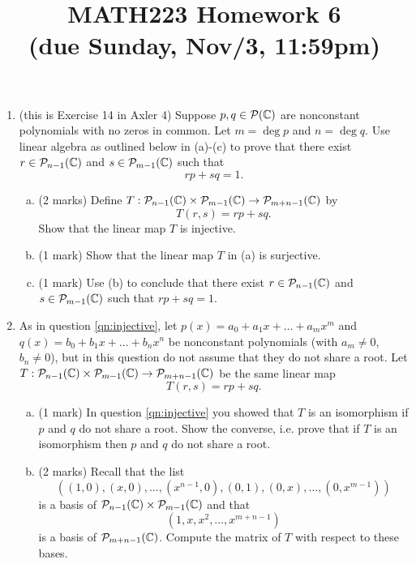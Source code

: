 \documentclass[12pt]{article}
\begin{document}
\title{MATH223 Homework 6\\ (due Sunday, Nov/3, 11:59pm)}
\author{}
\date{}
\maketitle
{}

\begin{enumerate}
\item \label{qn:injective}(this is Exercise 14 in Axler 4) Suppose $p,q\in\mathcal{P}(\mathbb{C})$ are nonconstant polynomials with no zeros in common. Let $m=\deg p$ and $n=\deg q$. Use linear algebra as outlined below in (a)-(c) to prove that there exist $r\in \mathcal{P}_{n-1}(\mathbb{C})$ and $s\in\mathcal{P}_{m-1}(\mathbb{C})$ such that
  \[
    rp+sq=1.
  \]
  \begin{enumerate}[(a)]
  \item (2 marks) Define $T:\mathcal{P}_{n-1}(\mathbb{C})\times \mathcal{P}_{m-1}(\mathbb{C})\to \mathcal{P}_{m+n-1}(\mathbb{C})$ by
    \[
      T(r,s)=rp+sq.
    \]
    Show that the linear map $T$ is injective.
  \item (1 mark) Show that the linear map $T$ in (a) is surjective.
  \item (1 mark) Use (b) to conclude that there exist $r\in\mathcal{P}_{n-1}(\mathbb{C})$ and $s\in\mathcal{P}_{m-1}(\mathbb{C})$ such that \mbox{$rp+sq=1$}.
  \end{enumerate}
\item \label{qn:resultant} As in question \ref{qn:injective}, let $p(x)=a_0+a_1x+\ldots +a_mx^m$ and $q(x)=b_0+b_1x+\ldots +b_nx^n$ be nonconstant polynomials (with $a_m\neq 0$, $b_n\neq 0$), but in this question do not assume that they do not share a root. Let $T:\mathcal{P}_{n-1}(\mathbb{C})\times \mathcal{P}_{m-1}(\mathbb{C})\to \mathcal{P}_{m+n-1}(\mathbb{C})$ be the same linear map
  \[
    T(r,s)=rp+sq.    
  \]
  \begin{enumerate}[(a)]
  \item (1 mark) In question \ref{qn:injective} you showed that $T$ is an isomorphism if $p$ and $q$ do not share a root. Show the converse, i.e. prove that if $T$ is an isomorphism then $p$ and $q$ do not share a root.
  \item (2 marks) Recall that the list
    \[
      \left((1,0),(x,0),\ldots ,(x^{n-1},0), (0,1), (0,x), \ldots ,(0,x^{m-1})\right)
    \]
    is a basis of $\mathcal{P}_{n-1}(\mathbb{C})\times \mathcal{P}_{m-1}(\mathbb{C})$ and that
    \[
      (1,x,x^2,\ldots ,x^{m+n-1})
    \]
    is a basis of $\mathcal{P}_{m+n-1}(\mathbb{C})$. Compute the matrix of $T$ with respect to these bases.

\end{enumerate}
\end{enumerate}
\end{document}
